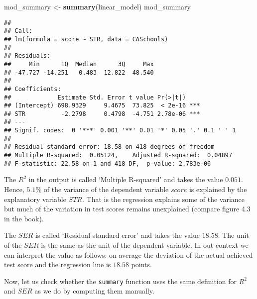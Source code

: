 \documentclass[]{book}
\newenvironment{Shaded}{\begin{snugshade}}{\end{snugshade}}
\newcommand{\KeywordTok}[1]{\textcolor[rgb]{0.13,0.29,0.53}{\textbf{#1}}}
\newcommand{\DecValTok}[1]{\textcolor[rgb]{0.00,0.00,0.81}{#1}}
\newcommand{\StringTok}[1]{\textcolor[rgb]{0.31,0.60,0.02}{#1}}
\newcommand{\CommentTok}[1]{\textcolor[rgb]{0.56,0.35,0.01}{\textit{#1}}}
\newcommand{\OperatorTok}[1]{\textcolor[rgb]{0.81,0.36,0.00}{\textbf{#1}}}
\newcommand{\NormalTok}[1]{#1}
\theoremstyle{definition}
\theoremstyle{definition}
\theoremstyle{definition}
\theoremstyle{remark}
\begin{document}
\begin{Shaded}
\begin{Highlighting}[]
\NormalTok{mod_summary <-}\StringTok{ }\KeywordTok{summary}\NormalTok{(linear_model)}
\NormalTok{mod_summary}
\end{Highlighting}
\end{Shaded}

\begin{verbatim}
## 
## Call:
## lm(formula = score ~ STR, data = CASchools)
## 
## Residuals:
##     Min      1Q  Median      3Q     Max 
## -47.727 -14.251   0.483  12.822  48.540 
## 
## Coefficients:
##             Estimate Std. Error t value Pr(>|t|)    
## (Intercept) 698.9329     9.4675  73.825  < 2e-16 ***
## STR          -2.2798     0.4798  -4.751 2.78e-06 ***
## ---
## Signif. codes:  0 '***' 0.001 '**' 0.01 '*' 0.05 '.' 0.1 ' ' 1
## 
## Residual standard error: 18.58 on 418 degrees of freedom
## Multiple R-squared:  0.05124,    Adjusted R-squared:  0.04897 
## F-statistic: 22.58 on 1 and 418 DF,  p-value: 2.783e-06
\end{verbatim}

The \(R^2\) in the output is called `Multiple R-squared' and takes the
value \(0.051\). Hence, \(5.1 \%\) of the variance of the dependent
variable \(score\) is explained by the explanatory variable \(STR\).
That is the regression explains some of the variance but much of the
variation in test scores remains unexplained (compare figure 4.3 in the
book).

The \(SER\) is called `Residual standard error' and takes the value
\(18.58\). The unit of the \(SER\) is the same as the unit of the
dependent variable. In out context we can interpret the value as
follows: on average the deviation of the actual achieved test score and
the regression line is \(18.58\) points.

Now, let us check whether the \texttt{summary} function uses the same
definition for \(R^2\) and \(SER\) as we do by computing them manually.

\begin{Shaded}
\end{Shaded}
\end{document}
